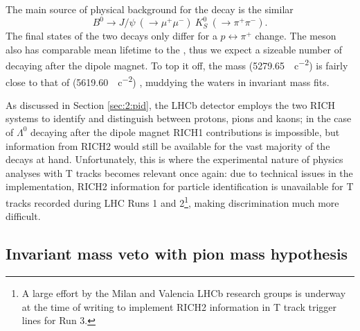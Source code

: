 The main source of physical background for the \demonstratorfull decay is the similar
\begin{equation}
	B^0 \rightarrow J/\psi~(\rightarrow \mu^+ \mu^-)~K_S^0~(\rightarrow \pi^+ \pi^-).
\end{equation}
The final states of the two decays only differ for a $p \leftrightarrow \pi^+$ change.
The \kshort meson also has comparable mean lifetime to the \lz, thus we expect a sizeable number of \kshort decaying after the dipole magnet.
To top it off, the \bz mass (\SI{5279.65}{\mev\per c\squared}) is fairly close to that of \lbz (\SI{5619.60}{\mev\per c\squared}) \cite{PDG}, muddying the waters in invariant mass fits.

As discussed in Section \ref{sec:2:pid}, the LHCb detector employs the two RICH systems to identify and distinguish between protons, pions and kaons;
in the case of $\Lambda^0$ decaying after the dipole magnet RICH1 contributions is impossible, but information from RICH2 would still be available for the vast majority of the decays at hand.
Unfortunately, this is where the experimental nature of physics analyses with T tracks becomes relevant once again:
due to technical issues in the implementation, RICH2 information for particle identification is unavailable for T tracks recorded during LHC Runs 1 and 2\footnote{A large effort by the Milan and Valencia LHCb research groups is underway at the time of writing to implement RICH2 information in T track trigger lines for Run 3.}, making \physbkgshort discrimination much more difficult.

\subsection{Invariant mass veto with pion mass hypothesis}
\label{sec:B0_veto}

